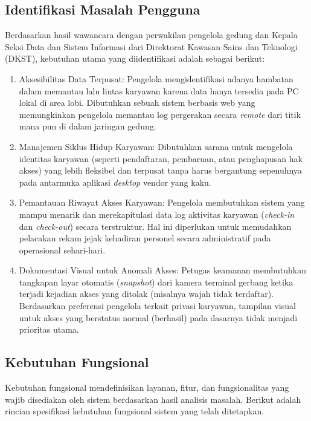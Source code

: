\subsection{Identifikasi Masalah Pengguna}
Berdasarkan hasil wawancara dengan perwakilan pengelola gedung dan Kepala Seksi Data dan Sistem Informasi dari Direktorat Kawasan Sains dan Teknologi (DKST), kebutuhan utama yang diidentifikasi adalah sebagai berikut:
\begin{enumerate}
    \item Aksesibilitas Data Terpusat: Pengelola mengidentifikasi adanya hambatan dalam memantau lalu lintas karyawan karena data hanya tersedia pada PC lokal di area lobi. Dibutuhkan sebuah sistem berbasis web yang memungkinkan pengelola memantau log pergerakan secara \textit{remote} dari titik mana pun di dalam jaringan gedung.
    \item Manajemen Siklus Hidup Karyawan: Dibutuhkan sarana untuk mengelola identitas karyawan (seperti pendaftaran, pembaruan, atau penghapusan hak akses) yang lebih fleksibel dan terpusat tanpa harus bergantung sepenuhnya pada antarmuka aplikasi \textit{desktop} vendor yang kaku.
    \item Pemantauan Riwayat Akses Karyawan: Pengelola membutuhkan sistem yang mampu menarik dan merekapitulasi data log aktivitas karyawan (\textit{check-in} dan \textit{check-out}) secara terstruktur. Hal ini diperlukan untuk memudahkan pelacakan rekam jejak kehadiran personel secara administratif pada operasional sehari-hari.
    \item Dokumentasi Visual untuk Anomali Akses: Petugas keamanan membutuhkan tangkapan layar otomatis (\textit{snapshot}) dari kamera terminal gerbang ketika terjadi kejadian akses yang ditolak (misalnya wajah tidak terdaftar). Berdasarkan preferensi pengelola terkait privasi karyawan, tampilan visual untuk akses yang berstatus normal (berhasil) pada dasarnya tidak menjadi prioritas utama.
\end{enumerate}

\subsection{Kebutuhan Fungsional}
Kebutuhan fungsional mendefinisikan layanan, fitur, dan fungsionalitas yang wajib disediakan oleh sistem berdasarkan hasil analisis masalah. Berikut adalah rincian spesifikasi kebutuhan fungsional sistem yang telah ditetapkan.




